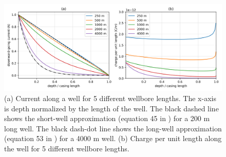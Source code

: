 \begin{figure}[htb]
    \begin{center}
    \includegraphics[width=\columnwidth]{figures/casing_software/kaufman_finite_well.png}
    \end{center}
\caption{
    (a) Current along a well for 5 different wellbore lengths.
    The x-axis is depth normalized by the length of the well. The black
    dashed line shows the short-well approximation (equation 45 in \cite{Kaufman1993})
    for a 200 m long well. The black dash-dot line shows the long-well approximation
    (equation 53 in \cite{Kaufman1993}) for a 4000 m well.
    (b) Charge per unit length along the well for 5 different wellbore lengths.
}
\label{fig:kaufman_finite_well}
\end{figure}
